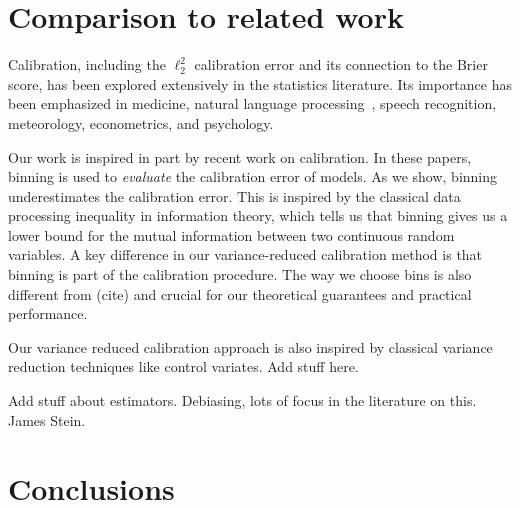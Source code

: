 \section{Comparison to related work}

Calibration, including the $\ell_2^2$ calibration error and its connection to the Brier score, has been explored extensively in the statistics literature. Its importance has been emphasized in medicine, natural language processing~\cite{jiang2012calibrating}, speech recognition, meteorology, econometrics, and psychology.

Our work is inspired in part by recent work on calibration. In these papers, binning is used to \emph{evaluate} the calibration error of models. As we show, binning underestimates the calibration error. This is inspired by the classical data processing inequality in information theory, which tells us that binning gives us a lower bound for the mutual information between two continuous random variables. A key difference in our variance-reduced calibration method is that binning is part of the calibration procedure. The way we choose bins is also different from (cite) and crucial for our theoretical guarantees and practical performance.

Our variance reduced calibration approach is also inspired by classical variance reduction techniques like control variates. Add stuff here.

Add stuff about estimators. Debiasing, lots of focus in the literature on this. James Stein.

\section{Conclusions}




